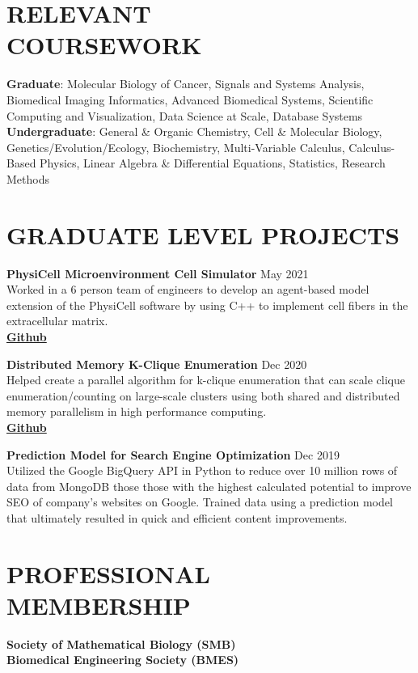 \documentclass[margin, 10pt]{res} %
\begin{document}
\begin{resume}
\section{RELEVANT \\ COURSEWORK}
\textbf{Graduate}: Molecular Biology of Cancer, Signals and Systems Analysis, Biomedical Imaging Informatics, Advanced Biomedical Systems, Scientific Computing and Visualization, Data Science at Scale, Database Systems \\
\textbf{Undergraduate}: General \& Organic Chemistry, Cell \& Molecular Biology, Genetics/Evolution/Ecology, Biochemistry, Multi-Variable Calculus, Calculus-Based Physics, Linear Algebra \& Differential Equations, Statistics, Research Methods

\section{GRADUATE LEVEL PROJECTS}
{\bf PhysiCell Microenvironment Cell Simulator} \hfill May 2021 \\
Worked in a 6 person team of engineers to develop an agent-based model extension of the PhysiCell software by using C++ to implement cell fibers in the extracellular matrix. \\
{\bf \textcolor{MidnightBlue}{\href{https://github.com/CJohnsonMathSys/PhysiMESS}{Github}}}

{\bf Distributed Memory K-Clique Enumeration} \hfill Dec 2020 \\
Helped create a parallel algorithm for k-clique enumeration that can scale clique enumeration/counting on large-scale clusters using both shared and distributed memory parallelism in high performance computing. \\
{\bf \textcolor{MidnightBlue}{\href{https://github.com/nikitavakoli/CSCI-596-Project}{Github}}}

{\bf Prediction Model for Search Engine Optimization} \hfill  Dec 2019 \\
Utilized the Google BigQuery API in Python to reduce over 10 million rows of data from MongoDB those those with the highest calculated potential to improve SEO of company’s websites on Google. Trained data using a prediction model that ultimately resulted in quick and efficient content improvements. 


\vspace{0.3 cm}

\section{PROFESSIONAL \\ MEMBERSHIP}
\hspace{0.4 cm}\textbf{Society of Mathematical Biology (SMB)} \\
\vspace{0.2 cm}
\hspace{0.3 cm}\textbf{Biomedical Engineering Society (BMES)} \\ 





\end{resume}
\end{document}
